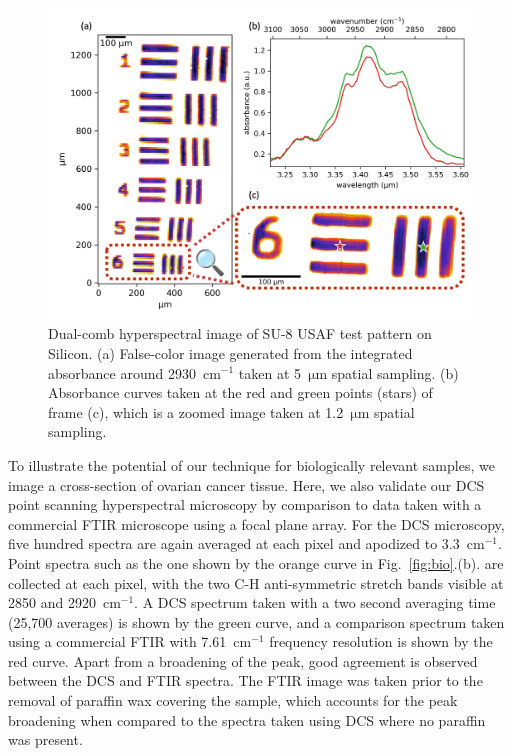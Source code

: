 \documentclass[aip,reprint]{revtex4-1}
\begin{document}
\begin{figure}[!h]
    \centering
    \includegraphics[width=\linewidth]{su8_image.png}
    \caption{Dual-comb hyperspectral image of SU-8 USAF test pattern on Silicon. (a) False-color image generated from the integrated absorbance around \mbox{2930 $\mathrm{cm^{-1}}$} taken at \mbox{5 $\mathrm{\mu m}$} spatial sampling. (b) Absorbance curves taken at the red and green points (stars) of frame (c), which is a zoomed image taken at \mbox{1.2 $\mathrm{\mu m}$} spatial sampling.}
    \label{fig:su8}
\end{figure}

To illustrate the potential of our technique for biologically relevant samples, we image a cross-section of ovarian cancer tissue. Here, we also validate our DCS point scanning hyperspectral microscopy by comparison to data taken with a commercial FTIR microscope using a focal plane array.  For the DCS microscopy, five hundred spectra are again averaged at each pixel and apodized to \mbox{3.3 $\mathrm{cm^{-1}}$}. Point spectra such as the one shown by the orange curve in \mbox{Fig. \ref{fig:bio}.(b).} are collected at each pixel, with the two C-H anti-symmetric stretch bands visible at 2850 and \mbox{2920 $\mathrm{cm^{-1}}$}. A DCS spectrum taken with a two second averaging time (25,700 averages) is shown by the green curve, and a comparison spectrum taken using a commercial FTIR with \mbox{7.61 $\mathrm{cm^{-1}}$} frequency resolution is shown by the red curve. Apart from a broadening of the peak, good agreement is observed between the DCS and FTIR spectra. The FTIR image was taken prior to the removal of paraffin wax covering the sample, which accounts for the peak broadening when compared to the spectra taken using DCS where no paraffin was present. 
\end{document}
